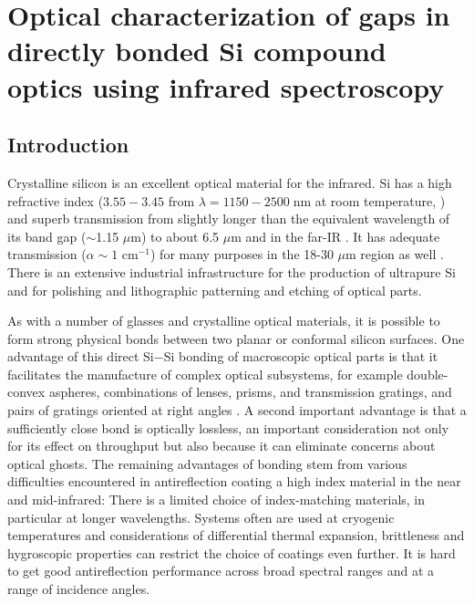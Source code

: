 \chapter{Optical characterization of gaps in directly bonded Si compound optics using infrared spectroscopy}


\section{Introduction}

Crystalline silicon is an excellent optical material for the infrared. Si has a high refractive index ($3.55-3.45$ from $\lambda = 1150-2500\;$nm at room temperature, \cite{2006SPIE.6273E..77F}) and superb transmission from slightly longer than the equivalent wavelength of its band gap ($\sim$1.15 $\mu$m) to about 6.5 $\mu$m \cite{PhysRev.108.268, PhysRev.78.178} and in the far-IR \cite{doi:10.1117/12.323764}.  It has adequate transmission  ($\alpha \sim 1$ cm$^{-1}$) for many purposes in the 18-30 $\mu$m region as well \cite{doi:10.1117/12.323764}.  There is an extensive industrial infrastructure for the production of ultrapure Si and for polishing and lithographic patterning and etching of optical parts.

As with a number of glasses and crystalline optical materials, it is possible to form strong physical bonds between two planar or conformal silicon surfaces.  One advantage of this direct Si$-$Si bonding of macroscopic optical parts is that it facilitates the manufacture of complex optical subsystems, for example double-convex aspheres, combinations of lenses, prisms, and transmission gratings, and pairs of gratings oriented at right angles \cite{2012SPIE.8450E..2TV, 2010SPIE.7739E.123G}.  A second important advantage is that a sufficiently close bond is optically lossless, an important consideration not only for its effect on throughput but also because it can eliminate concerns about optical ghosts.  The remaining advantages of bonding stem from various difficulties encountered in antireflection coating a high index material in the near and mid-infrared:  There is a limited choice of index-matching materials, in particular at longer wavelengths.  Systems often are used at cryogenic temperatures and considerations of differential thermal expansion, brittleness and hygroscopic properties can restrict the choice of coatings even further. It is hard to get good antireflection performance across broad spectral ranges and at a range of incidence angles.


